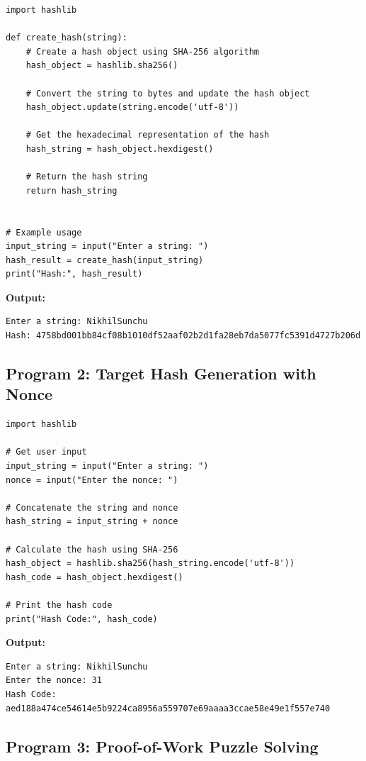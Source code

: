 \documentclass[12pt,a4paper]{article}
\begin{document}
\begin{lstlisting}[style=pythonstyle]
import hashlib

def create_hash(string):
    # Create a hash object using SHA-256 algorithm
    hash_object = hashlib.sha256()

    # Convert the string to bytes and update the hash object
    hash_object.update(string.encode('utf-8'))

    # Get the hexadecimal representation of the hash
    hash_string = hash_object.hexdigest()

    # Return the hash string
    return hash_string


# Example usage
input_string = input("Enter a string: ")
hash_result = create_hash(input_string)
print("Hash:", hash_result)
\end{lstlisting}

\textbf{Output:}
\begin{lstlisting}[style=outputstyle]
Enter a string: NikhilSunchu
Hash: 4758bd001bb84cf08b1010df52aaf02b2d1fa28eb7da5077fc5391d4727b206d
\end{lstlisting}

\subsection{Program 2: Target Hash Generation with Nonce}

\begin{lstlisting}[style=pythonstyle]
import hashlib

# Get user input
input_string = input("Enter a string: ")
nonce = input("Enter the nonce: ")

# Concatenate the string and nonce
hash_string = input_string + nonce

# Calculate the hash using SHA-256
hash_object = hashlib.sha256(hash_string.encode('utf-8'))
hash_code = hash_object.hexdigest()

# Print the hash code
print("Hash Code:", hash_code)
\end{lstlisting}

\textbf{Output:}
\begin{lstlisting}[style=outputstyle]
Enter a string: NikhilSunchu
Enter the nonce: 31
Hash Code:
aed188a474ce54614e5b9224ca8956a559707e69aaaa3ccae58e49e1f557e740
\end{lstlisting}

\subsection{Program 3: Proof-of-Work Puzzle Solving}
\end{document}
